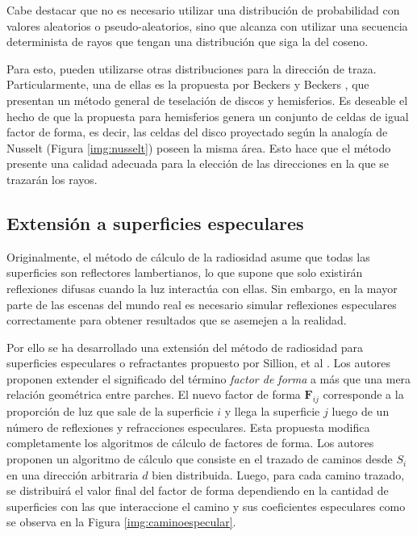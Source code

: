 Cabe destacar que no es necesario utilizar una distribución de probabilidad con valores aleatorios o pseudo-aleatorios, sino que alcanza con utilizar una secuencia determinista de rayos que tengan una distribución que siga la del coseno.

Para esto, pueden utilizarse otras distribuciones para la dirección de traza. Particularmente, una de ellas es la propuesta por Beckers y Beckers \cite{Beckers}, que presentan un método general de teselación de discos y hemisferios. Es deseable el hecho de que la propuesta para hemisferios genera un conjunto de celdas de igual factor de forma, es decir, las celdas del disco proyectado según la analogía de Nusselt (Figura \ref{img:nusselt}) poseen la misma área. Esto hace que el método presente una calidad adecuada para la elección de las direcciones en la que se trazarán los rayos.

\subsection{Extensión a superficies especulares}

Originalmente, el método de cálculo de la radiosidad asume que todas las superficies son reflectores lambertianos, lo que supone que solo existirán reflexiones difusas cuando la luz interactúa con ellas. Sin embargo, en la mayor parte de las escenas del mundo real es necesario simular reflexiones especulares correctamente para obtener resultados que se asemejen a la realidad.

Por ello se ha desarrollado una extensión del método de radiosidad para superficies especulares o refractantes propuesto por Sillion, et al \cite{Sillion}. Los autores proponen extender el significado del término \textit{factor de forma} a más que una mera relación geométrica entre parches. El nuevo factor de forma $\mathbf{F}_{ij}$ corresponde a la proporción de luz que sale de la superficie $i$ y llega la superficie $j$ luego de un número de reflexiones y refracciones especulares. Esta propuesta modifica completamente los algoritmos de cálculo de factores de forma. Los autores proponen un algoritmo de cálculo que consiste en el trazado de caminos desde $S_{i}$ en una dirección arbitraria $d$ bien distribuida.  Luego, para cada camino trazado, se distribuirá el valor final del factor de forma dependiendo en la cantidad de superficies con las que interaccione el camino y sus coeficientes especulares como se observa en la Figura \ref{img:caminoespecular}.

